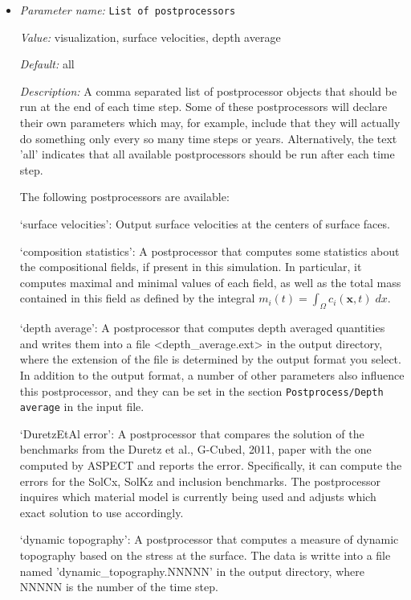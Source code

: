 \begin{itemize}
\item {\it Parameter name:} {\tt List of postprocessors}


{\it Value:} visualization, surface velocities, depth average


{\it Default:} all


{\it Description:} A comma separated list of postprocessor objects that should be run at the end of each time step. Some of these postprocessors will declare their own parameters which may, for example, include that they will actually do something only every so many time steps or years. Alternatively, the text 'all' indicates that all available postprocessors should be run after each time step.

The following postprocessors are available:

`surface velocities': Output surface velocities at the centers of surface faces.

`composition statistics': A postprocessor that computes some statistics about the compositional fields, if present in this simulation. In particular, it computes maximal and minimal values of each field, as well as the total mass contained in this field as defined by the integral $m_i(t) = \int_\Omega c_i(\mathbf x,t) \; dx$.

`depth average': A postprocessor that computes depth averaged quantities and writes them into a file <depth_average.ext> in the output directory, where the extension of the file is determined by the output format you select. In addition to the output format, a number of other parameters also influence this postprocessor, and they can be set in the section \texttt{Postprocess/Depth average} in the input file. 

`DuretzEtAl error': A postprocessor that compares the solution of the benchmarks from the Duretz et al., G-Cubed, 2011, paper with the one computed by ASPECT and reports the error. Specifically, it can compute the errors for the SolCx, SolKz and inclusion benchmarks. The postprocessor inquires which material model is currently being used and adjusts which exact solution to use accordingly.

`dynamic topography': A postprocessor that computes a measure of dynamic topography based on the stress at the surface. The data is writte into a file named 'dynamic_topography.NNNNN' in the output directory, where NNNNN is the number of the time step.


\end{itemize}
